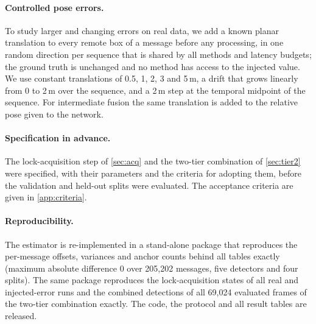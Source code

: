 \paragraph{Controlled pose errors.}
To study larger and changing errors on real data, we add a known planar translation to every remote box of a message before any processing, in one random direction per sequence that is shared by all methods and latency budgets; the ground truth is unchanged and no method has access to the injected value.
We use constant translations of 0.5, 1, 2, 3 and 5\,m, a drift that grows linearly from 0 to 2\,m over the sequence, and a 2\,m step at the temporal midpoint of the sequence.
For intermediate fusion the same translation is added to the relative pose given to the network.

\paragraph{Specification in advance.}
The lock-acquisition step of \cref{sec:acq} and the two-tier combination of \cref{sec:tier2} were specified, with their parameters and the criteria for adopting them, before the validation and held-out splits were evaluated.
The acceptance criteria are given in \cref{app:criteria}.

\paragraph{Reproducibility.}
The estimator is re-implemented in a stand-alone package that reproduces the per-message offsets, variances and anchor counts behind all tables exactly (maximum absolute difference 0 over 205,202 messages, five detectors and four splits).
The same package reproduces the lock-acquisition states of all real and injected-error runs and the combined detections of all 69,024 evaluated frames of the two-tier combination exactly.
The code, the protocol and all result tables are released.
